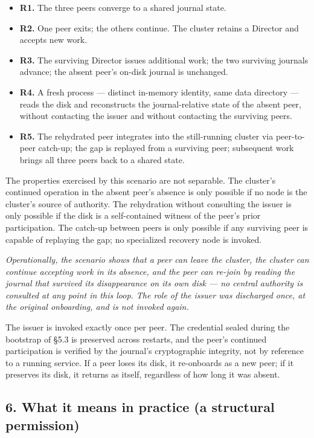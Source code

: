 \documentclass[
]{article}
\providecommand{\tightlist}{%
  \setlength{\itemsep}{0pt}\setlength{\parskip}{0pt}}
\begin{document}
\begin{itemize}
\tightlist
\item
  \textbf{R1.} The three peers converge to a shared journal state.
\item
  \textbf{R2.} One peer exits; the others continue. The cluster retains
  a Director and accepts new work.
\item
  \textbf{R3.} The surviving Director issues additional work; the two
  surviving journals advance; the absent peer's on-disk journal is
  unchanged.
\item
  \textbf{R4.} A fresh process --- distinct in-memory identity, same
  data directory --- reads the disk and reconstructs the
  journal-relative state of the absent peer, without contacting the
  issuer and without contacting the surviving peers.
\item
  \textbf{R5.} The rehydrated peer integrates into the still-running
  cluster via peer-to-peer catch-up; the gap is replayed from a
  surviving peer; subsequent work brings all three peers back to a
  shared state.
\end{itemize}

The properties exercised by this scenario are not separable. The
cluster's continued operation in the absent peer's absence is only
possible if no node is the cluster's source of authority. The
rehydration without consulting the issuer is only possible if the disk
is a self-contained witness of the peer's prior participation. The
catch-up between peers is only possible if any surviving peer is capable
of replaying the gap; no specialized recovery node is invoked.

\emph{Operationally, the scenario shows that a peer can leave the
cluster, the cluster can continue accepting work in its absence, and the
peer can re-join by reading the journal that survived its disappearance
on its own disk --- no central authority is consulted at any point in
this loop. The role of the issuer was discharged once, at the original
onboarding, and is not invoked again.}

The issuer is invoked exactly once per peer. The credential sealed
during the bootstrap of §5.3 is preserved across restarts, and the
peer's continued participation is verified by the journal's
cryptographic integrity, not by reference to a running service. If a
peer loses its disk, it re-onboards as a new peer; if it preserves its
disk, it returns as itself, regardless of how long it was absent.

\subsection{6. What it means in practice (a structural
permission)}\label{what-it-means-in-practice-a-structural-permission}
\end{document}
